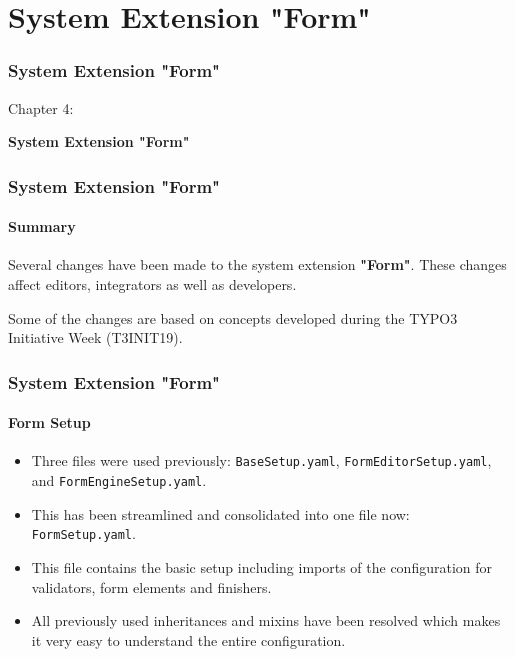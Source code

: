 %

\section{System Extension "Form"}
\begin{frame}[fragile]
	\frametitle{System Extension "Form"}

	\begin{center}\huge{Chapter 4:}\end{center}
	\begin{center}\huge{\color{typo3darkgrey}\textbf{System Extension "Form"}}\end{center}

\end{frame}


\begin{frame}[fragile]
	\frametitle{System Extension "Form"}
	\framesubtitle{Summary}

	\small
		Several changes have been made to the system extension \textbf{"Form"}.
		These changes affect editors, integrators as well as developers.

		\vspace{0.2cm}

		Some of the changes are based on concepts developed during the TYPO3 Initiative Week (T3INIT19).

	\normalsize

\end{frame}


\begin{frame}[fragile]
	\frametitle{System Extension "Form"}
	\framesubtitle{Form Setup}

	\begin{itemize}
		\item Three files were used previously: \texttt{BaseSetup.yaml}, \texttt{FormEditorSetup.yaml}, and \texttt{FormEngineSetup.yaml}.
		\item This has been streamlined and consolidated into one file now: \texttt{FormSetup.yaml}.
		\item This file contains the basic setup including imports of the configuration for validators, form elements and finishers.
		\item All previously used inheritances and mixins have been resolved which makes it very easy to understand the entire configuration.
	\end{itemize}

\end{frame}

